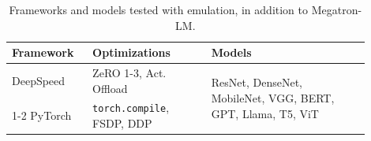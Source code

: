 \begin{table}[htbp]
\vspace{1em}
\begin{tabular}{m{0.2\linewidth} m{0.3\linewidth} p{0.4\linewidth}}
    \toprule
    \textbf{Framework} & \textbf{Optimizations} & \textbf{Models} \\
    \midrule
    DeepSpeed & ZeRO 1-3, \newline Act. Offload & \multirow{3}{\linewidth}{ResNet, DenseNet, MobileNet, VGG, BERT, GPT, Llama, T5, ViT} \\
    \cmidrule{1-2}
    PyTorch & \texttt{torch.compile}, FSDP, DDP \\
    \bottomrule
\end{tabular}
\caption{Frameworks and models tested with \sysname emulation, in addition to Megatron-LM.}
\label{tab:framework_generality}
\end{table}
